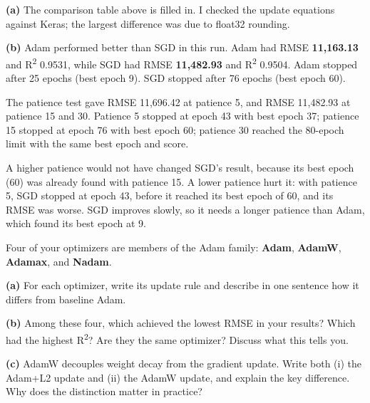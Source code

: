 \documentclass[12pt,a4paper]{article}
\begin{document}
\begin{answerbox}
\textbf{(a)} The comparison table above is filled in. I checked the update equations against Keras; the largest difference was due to float32 rounding.

\textbf{(b)} Adam performed better than SGD in this run. Adam had RMSE \textbf{11,163.13} and R\textsuperscript{2} 0.9531, while SGD had RMSE \textbf{11,482.93} and R\textsuperscript{2} 0.9504. Adam stopped after 25 epochs (best epoch 9). SGD stopped after 76 epochs (best epoch 60).

The patience test gave RMSE 11,696.42 at patience 5, and RMSE 11,482.93 at patience 15 and 30. Patience 5 stopped at epoch 43 with best epoch 37; patience 15 stopped at epoch 76 with best epoch 60; patience 30 reached the 80-epoch limit with the same best epoch and score.

A higher patience would not have changed SGD's result, because its best epoch (60) was already found with patience 15. A lower patience hurt it: with patience 5, SGD stopped at epoch 43, before it reached its best epoch of 60, and its RMSE was worse. SGD improves slowly, so it needs a longer patience than Adam, which found its best epoch at 9.
\end{answerbox}

\begin{tcolorbox}[colback=lightblue!40, colframe=myColorB,
  title={\textbf{Question 4 — The Adam Optimizer Family} \hfill \normalfont(15 pts)},
  fonttitle=\normalsize\bfseries, breakable]

Four of your optimizers are members of the Adam family: \textbf{Adam},
\textbf{AdamW}, \textbf{Adamax}, and \textbf{Nadam}.

\textbf{(a)} For each optimizer, write its update rule and describe in one sentence
how it differs from baseline Adam.

\textbf{(b)} Among these four, which achieved the lowest RMSE in your results?
Which had the highest R\textsuperscript{2}? Are they the same optimizer?
Discuss what this tells you.

\textbf{(c)} AdamW decouples weight decay from the gradient update.
Write both (i) the Adam+L2 update and (ii) the AdamW update, and explain the
key difference. Why does the distinction matter in practice?
\end{tcolorbox}
\end{document}
